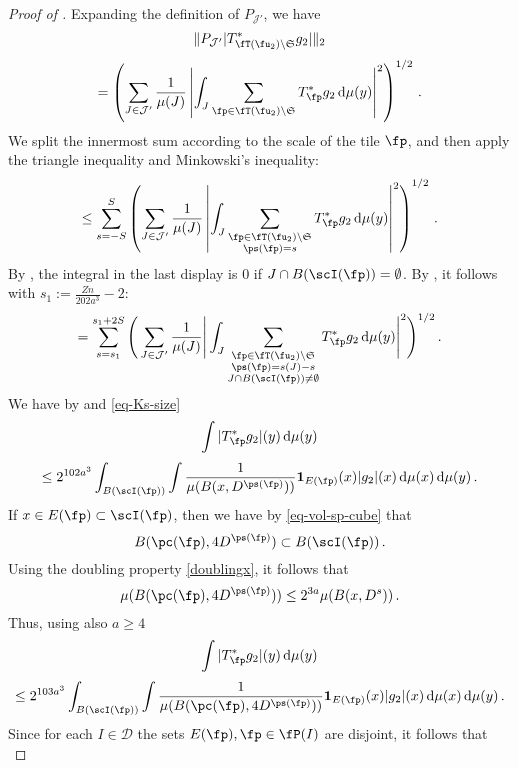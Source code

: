 \begin{proof}[Proof of ]
    Expanding the definition of $P_{\mathcal{J}'}$, we have
    $$
        \|P_{\mathcal{J}'}|T_{\fT(\fu_2) \setminus \mathfrak{S}}^* g_2|\|_2
    $$
    $$
        = \left(\sum_{J \in \mathcal{J}'} \frac{1}{\mu(J)} \left|\int_J \sum_{\fp \in \fT(\fu_2) \setminus \mathfrak{S}} T_{\fp}^* g_2 \, \mathrm{d}\mu(y) \right|^2 \right)^{1/2}\,.
    $$
    We split the innermost sum according to the scale of the tile $\fp$, and then apply the triangle inequality and Minkowski's inequality:
    $$
        \le \sum_{s = -S}^S \left( \sum_{J \in \mathcal{J}'} \frac{1}{\mu(J)} \left|\int_J \sum_{\substack{\fp \in \fT(\fu_2) \setminus \mathfrak{S}\\ \ps(\fp) = s}} T_{\fp}^* g_2 \, \mathrm{d}\mu(y) \right|^2\right)^{1/2}\,.
    $$
    By , the integral in the last display is $0$ if $J \cap B(\scI(\fp)) = \emptyset$. By , it follows with $s_1 := \frac{Zn}{202a^3} - 2$:
    \begin{equation}
    \label{eq-sep-tree-small-1}
        = \sum_{s = s_1}^{s_1 + 2S} \Bigg( \sum_{J \in \mathcal{J}'} \frac{1}{\mu(J)} \Bigg|\int_J \sum_{\substack{\fp \in \fT(\fu_2) \setminus \mathfrak{S}\\ \ps(\fp) = s(J) - s\\
        J \cap B(\scI(\fp)) \ne \emptyset}} T_{\fp}^* g_2 \, \mathrm{d}\mu(y) \Bigg|^2\Bigg)^{1/2}\,.
    \end{equation}
    We have by  and \eqref{eq-Ks-size}
    $$
        \int |T_{\fp}^* g_2|(y) \, \mathrm{d}\mu(y)
    $$
    $$
        \le 2^{102a^3} \int_{B(\scI(\fp))} \int \frac{1}{\mu(B(x, D^{\ps(\fp)}))} \mathbf{1}_{E(\fp)}(x) |g_2|(x) \, \mathrm{d}\mu(x) \, \mathrm{d}\mu(y)\,.
    $$
    If $x \in E(\fp) \subset \scI(\fp)$, then we have by \eqref{eq-vol-sp-cube} that
    $$
        B(\pc(\fp), 4D^{\ps(\fp)}) \subset B(\scI(\fp))\,.
    $$
    Using the doubling property \eqref{doublingx}, it follows that
    $$
        \mu(B(\pc(\fp), 4D^{\ps(\fp)})) \le 2^{3a} \mu(B(x, D^s))\,.
    $$
    Thus, using also $a \ge 4$
    $$
        \int |T_{\fp}^* g_2|(y) \, \mathrm{d}\mu(y)
    $$
    $$
        \le 2^{103 a^3} \int_{B(\scI(\fp))} \int \frac{1}{\mu(B(\pc(\fp), 4D^{\ps(\fp)}))} \mathbf{1}_{E(\fp)}(x) |g_2|(x) \, \mathrm{d}\mu(x) \, \mathrm{d}\mu(y)\,.
    $$
    Since for each $I \in \mathcal{D}$ the sets $E(\fp), \fp \in \fP(I)$ are disjoint, it follows that
    $$
$$
\end{proof}
